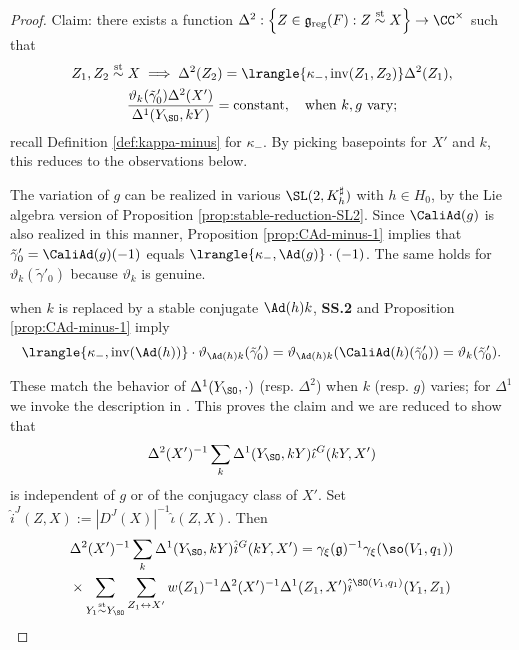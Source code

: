 \documentclass[a4paper,10pt]{article}
\begin{document}
\begin{proof}
	Claim: there exists a function $\Delta^2: \left\{Z \in \mathfrak{g}_\text{reg}(F) : Z \stackrel{\text{st}}{\sim} X \right\} \to \CC^\times$ such that
	\begin{gather*}
		 Z_1, Z_2 \stackrel{\text{st}}{\sim} X \implies \Delta^2(Z_2) = \lrangle{\kappa_-, \text{inv}(Z_1, Z_2)} \Delta^2(Z_1), \\
		\dfrac{\vartheta_k(\tilde{\gamma}'_0) \Delta^2(X') }{ \Delta^1(Y_{\SO}, kY) } = \text{constant}, \quad \text{when $k,g$ vary;}
	\end{gather*}
	recall Definition \ref{def:kappa-minus} for $\kappa_-$. By picking basepoints for $X'$ and $k$, this reduces to the observations below.
	\begin{compactitem}
		\item The variation of $g$ can be realized in various $\SL(2, K_h^\sharp)$ with $h \in H_0$, by the Lie algebra version of Proposition \ref{prop:stable-reduction-SL2}. Since $\CaliAd(g)$ is also realized in this manner, Proposition \ref{prop:CAd-minus-1} implies that $\tilde{\gamma}'_0 = \CaliAd(g)(-1)$ equals $\lrangle{\kappa_-, \Ad(g)} \cdot (-1)$. The same holds for $\vartheta_k(\tilde{\gamma}'_0)$ because $\vartheta_k$ is genuine.
		\item when $k$ is replaced by a stable conjugate $\Ad(h) k$, \textbf{SS.2} and Proposition \ref{prop:CAd-minus-1} imply
		\[ \lrangle{ \kappa_-, \text{inv}(\Ad(h)) } \cdot \vartheta_{\Ad(h)k}(\tilde{\gamma}'_0) = \vartheta_{\Ad(h)k}(\CaliAd(h)(\tilde{\gamma}'_0)) = \vartheta_k(\tilde{\gamma}'_0). \]
	\end{compactitem}
	These match the behavior of $\Delta^1(Y_{\SO}, \cdot)$ (resp. $\Delta^2$) when $k$ (resp. $g$) varies; for $\Delta^1$ we invoke the description in \cite[X.8]{Wa01}. This proves the claim and we are reduced to show that
	\begin{equation}\label{eqn:Delta-stability}
		\Delta^2(X')^{-1} \sum_k \Delta^1(Y_{\SO}, kY) \hat{\iota}^G(kY, X')
	\end{equation}
	is independent of $g$ or of the conjugacy class of $X'$. Set $\hat{i}^J(Z,X) := |D^J(X)|^{-1} \hat{\iota}(Z,X)$. Then
	\begin{multline*}
		\Delta^2(X')^{-1} \sum_k \Delta^1(Y_{\SO}, kY) \hat{i}^G(kY, X') = \gamma_\xi(\mathfrak{g})^{-1} \gamma_\xi(\so(V_1, q_1)) \\
		\times \sum_{Y_1 \stackrel{\text{st}}{\sim} Y_{\SO}} \sum_{Z_1 \leftrightarrow X'}  w(Z_1)^{-1} \Delta^2(X')^{-1} \Delta^1(Z_1, X')  \hat{i}^{\SO(V_1, q_1)}(Y_1, Z_1)
	\end{multline*}

\end{proof}
\end{document}
